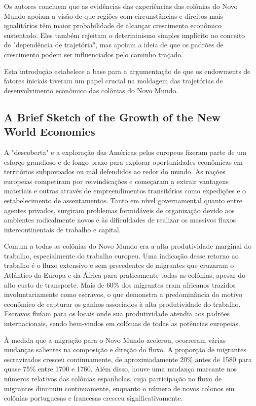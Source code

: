 \documentclass[a4paper,12pt]{article}[abntex2]
\begin{document}
Os autores concluem que as evidências das experiências das colônias do Novo Mundo apoiam a visão de que regiões com circunstâncias e direitos mais igualitários têm maior probabilidade de alcançar crescimento econômico sustentado. Eles também rejeitam o determinismo simples implícito no conceito de "dependência de trajetória", mas apoiam a ideia de que os padrões de crescimento podem ser influenciados pelo caminho traçado.

Esta introdução estabelece a base para a argumentação de que os endowments de fatores iniciais tiveram um papel crucial na moldagem das trajetórias de desenvolvimento econômico das colônias do Novo Mundo.

\subsection*{\textbf{A Brief Sketch of the Growth of the New World Economies}}

A "descoberta" e a exploração das Américas pelos europeus fizeram parte de um esforço grandioso e de longo prazo para explorar oportunidades econômicas em territórios subpovoados ou mal defendidos ao redor do mundo. As nações europeias competiram por reivindicações e começaram a extrair vantagens materiais e outras através de empreendimentos transitórios como expedições e o estabelecimento de assentamentos. Tanto em nível governamental quanto entre agentes privados, surgiram problemas formidáveis de organização devido aos ambientes radicalmente novos e às dificuldades de realizar os massivos fluxos intercontinentais de trabalho e capital.

Comum a todas as colônias do Novo Mundo era a alta produtividade marginal do trabalho, especialmente do trabalho europeu. Uma indicação desse retorno ao trabalho é o fluxo extensivo e sem precedentes de migrantes que cruzaram o Atlântico da Europa e da África para praticamente todas as colônias, apesar do alto custo de transporte. Mais de 60\% dos migrantes eram africanos trazidos involuntariamente como escravos, o que demonstra a predominância do motivo econômico de capturar os ganhos associados à alta produtividade do trabalho. Escravos fluíam para os locais onde sua produtividade atendia aos padrões internacionais, sendo bem-vindos em colônias de todas as potências europeias.

À medida que a migração para o Novo Mundo acelerou, ocorreram várias mudanças salientes na composição e direção do fluxo. A proporção de migrantes escravizados cresceu continuamente, de aproximadamente 20\% antes de 1580 para quase 75\% entre 1700 e 1760. Além disso, houve uma mudança marcante nos números relativos das colônias espanholas, cuja participação no fluxo de migrantes diminuiu continuamente, enquanto o número de novos colonos em colônias portuguesas e francesas cresceu significativamente.
\end{document}

